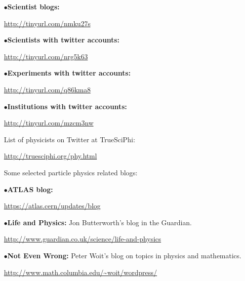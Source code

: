 \item{$\bullet$}{\bf Scientist blogs:} 
	\item{}\qquad\url{http://tinyurl.com/nmku27s}

\vfil\eject

\item{$\bullet$}{\bf Scientists with twitter accounts:} 
	\item{}\qquad\url{http://tinyurl.com/nrg5k63}

\item{$\bullet$}{\bf Experiments with twitter accounts:} 
	\item{}\qquad\url{http://tinyurl.com/q86kma8}

\item{$\bullet$}{\bf Institutions with twitter accounts:} 
	\item{}\qquad\url{http://tinyurl.com/mzcm3nw}

\medskip

List of physicists on Twitter at TrueSciPhi:

	\item{}\qquad\url{http://truesciphi.org/phy.html}

\medskip

Some selected particle physics related blogs:
 
\medskip

\item{$\bullet$}{\bf ATLAS blog:}
	\item{}\qquad\url{https://atlas.cern/updates/blog}





\medskip

\item{$\bullet$}{\bf Life and Physics:}
Jon Butterworth's blog in the Guardian.
	\item{}\qquad\url{http://www.guardian.co.uk/science/life-and-physics}

\medskip

\item{$\bullet$}{\bf Not Even Wrong:} 
Peter Woit's blog on topics in physics and mathematics.
	\item{}\qquad\url{http://www.math.columbia.edu/~woit/wordpress/}

